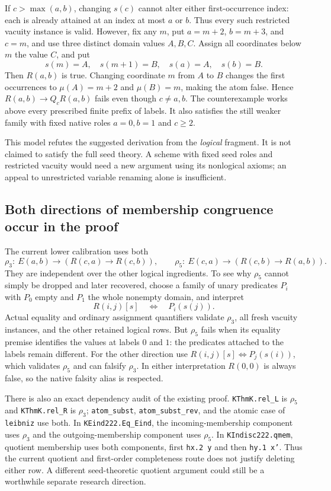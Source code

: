 If $c>\max(a,b)$, changing $s(c)$ cannot alter either first-occurrence
index: each is already attained at an index at most $a$ or $b$.
Thus every such restricted vacuity instance is valid. However, fix any
$m$, put $a=m+2$, $b=m+3$, and $c=m$, and use three distinct domain
values $A,B,C$. Assign all coordinates below $m$ the value $C$, and put
\[
 s(m)=A,\quad s(m+1)=B,\quad s(a)=A,\quad s(b)=B.
\]
Then $R(a,b)$ is true. Changing coordinate $m$ from $A$ to $B$ changes
the first occurrences to $\mu(A)=m+2$ and $\mu(B)=m$, making the atom
false. Hence $R(a,b)\to Q_cR(a,b)$ fails even though $c\ne a,b$.
The counterexample works above every prescribed finite prefix of labels.
It also satisfies the still weaker family with fixed native roles
$a=0,b=1$ and $c\geq2$.

This model refutes the suggested derivation from the \emph{logical}
fragment. It is not claimed to satisfy the full seed theory. A scheme
with fixed seed roles and restricted vacuity would need a new argument
using its nonlogical axioms; an appeal to unrestricted variable
renaming alone is insufficient.

\subsection{Both directions of membership congruence occur in the proof}

The current lower calibration uses both
\[
 \rho_3:\ E(a,b)\to(R(c,a)\to R(c,b)),\qquad
 \rho_5:\ E(c,a)\to(R(c,b)\to R(a,b)).
\]
They are independent over the other logical ingredients. To see why
$\rho_5$ cannot simply be dropped and later recovered, choose a family
of unary predicates $P_i$ with $P_0$ empty and $P_1$ the whole nonempty
domain, and interpret
\[
 R(i,j)[s]\quad\Longleftrightarrow\quad P_i(s(j)).
\]
Actual equality and ordinary assignment quantifiers validate $\rho_3$,
all fresh vacuity instances, and the other retained logical rows.
But $\rho_5$ fails when its equality premise identifies the values at
labels $0$ and $1$: the predicates attached to the labels remain
different. For the other direction use
$R(i,j)[s]\Longleftrightarrow P_j(s(i))$, which validates $\rho_5$ and
can falsify $\rho_3$. In either interpretation $R(0,0)$ is always false,
so the native falsity alias is respected.

There is also an exact dependency audit of the existing proof.
\texttt{KThmK.rel\_L} is $\rho_5$ and
\texttt{KThmK.rel\_R} is $\rho_3$;
\texttt{atom\_subst}, \texttt{atom\_subst\_rev}, and the atomic case of
\texttt{leibniz} use both.
In \texttt{KEind222.Eq\_Eind}, the incoming-membership component uses
$\rho_3$ and the outgoing-membership component uses $\rho_5$.
In \texttt{KIndisc222.qmem}, quotient membership uses both components,
first \texttt{hx.2 y} and then \texttt{hy.1 x'}.
Thus the current quotient and first-order completeness route does not
justify deleting either row. A different seed-theoretic quotient
argument could still be a worthwhile separate research direction.

